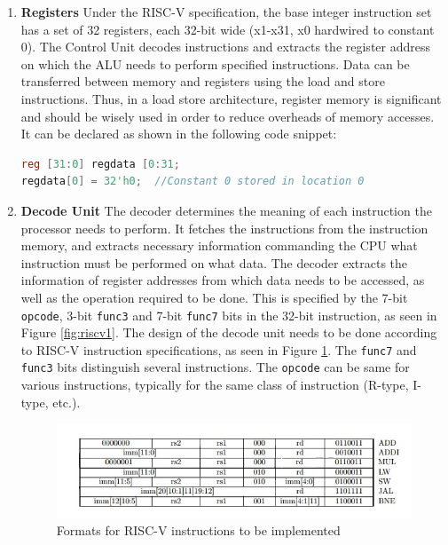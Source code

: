 \begin{enumerate}
\item \textbf{Registers} \newline
Under the RISC-V specification, the base integer instruction set has a set of 32 registers, each 32-bit wide (x1-x31, x0 hardwired to constant 0). The Control Unit decodes instructions and extracts the register address on which the ALU needs to perform specified instructions. Data can be transferred between memory and registers using the load and store instructions. Thus, in a load store architecture, register memory is significant and should be wisely used in order to reduce overheads of memory accesses. It can be declared as shown in the following code snippet:

\begin{lstlisting}[language=Verilog]
reg [31:0] regdata [0:31;
regdata[0] = 32'h0;  //Constant 0 stored in location 0
\end{lstlisting}

\item \textbf{Decode Unit} \newline
The decoder determines the meaning of each instruction the processor needs to perform. It fetches the instructions from the instruction memory, and extracts necessary information commanding the CPU what instruction must be performed on what data. \newline\newline
The decoder extracts the information of register addresses from which data needs to be accessed, as well as the operation required to be done. This is specified by the 7-bit \verb|opcode|, 3-bit \verb|func3| and 7-bit \verb|func7| bits in the 32-bit instruction, as seen in Figure \ref{fig:riscv1}.\newline\newline
The design of the decode unit needs to be done according to RISC-V instruction specifications, as seen in Figure \ref{fig:riscv6}. The \verb|func7| and \verb|func3| bits  distinguish several instructions. The \verb|opcode| can be same for various instructions, typically for the same class of instruction (R-type, I-type, etc.).

\begin{figure}[h!]
\centering
\includegraphics[width=\linewidth]{figures/RISCV_Instruction_Formats.jpg}
\caption{Formats for RISC-V instructions to be implemented \cite{riscv_isa_manual}}
\label{fig:riscv6}
\end{figure}


\end{enumerate}
